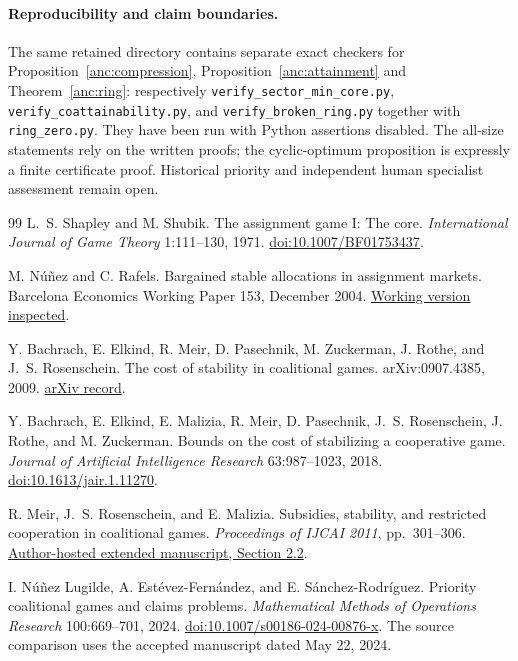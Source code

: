 \documentclass[11pt]{article}
\theoremstyle{remark}
\begin{document}
\paragraph{Reproducibility and claim boundaries.}
The same retained directory contains separate exact checkers for
Proposition~\ref{anc:compression}, Proposition~\ref{anc:attainment}
and Theorem~\ref{anc:ring}: respectively
\texttt{verify\_sector\_min\_core.py},
\texttt{verify\_coattainability.py}, and
\texttt{verify\_broken\_ring.py} together with \texttt{ring\_zero.py}.
They have been run with Python assertions disabled. The all-size
statements rely on the written proofs; the cyclic-optimum proposition
is expressly a finite certificate proof. Historical priority and
independent human specialist assessment remain open.

\begin{thebibliography}{99}
\small
{}
L.~S. Shapley and M. Shubik.
The assignment game I: The core.
\emph{International Journal of Game Theory} 1:111--130, 1971.
\href{https://doi.org/10.1007/BF01753437}{doi:10.1007/BF01753437}.

M. N\'u\~nez and C. Rafels.
Bargained stable allocations in assignment markets.
Barcelona Economics Working Paper 153, December 2004.
\href{https://www.bse.eu/sites/default/files/working_paper_pdfs/153.pdf}{Working version inspected}.

Y. Bachrach, E. Elkind, R. Meir, D. Pasechnik, M. Zuckerman,
J. Rothe, and J.~S. Rosenschein.
The cost of stability in coalitional games.
arXiv:0907.4385, 2009.
\href{https://arxiv.org/abs/0907.4385}{arXiv record}.

Y. Bachrach, E. Elkind, E. Malizia, R. Meir, D. Pasechnik,
J.~S. Rosenschein, J. Rothe, and M. Zuckerman.
Bounds on the cost of stabilizing a cooperative game.
\emph{Journal of Artificial Intelligence Research} 63:987--1023, 2018.
\href{https://doi.org/10.1613/jair.1.11270}{doi:10.1613/jair.1.11270}.

R. Meir, J.~S. Rosenschein, and E. Malizia.
Subsidies, stability, and restricted cooperation in coalitional games.
\emph{Proceedings of IJCAI 2011}, pp.~301--306.
\href{https://www.cs.huji.ac.il/~jeff/papers/coopmas11meir.pdf}{Author-hosted extended manuscript, Section 2.2}.

I. N\'u\~nez Lugilde, A. Est\'evez-Fern\'andez, and E. S\'anchez-Rodr\'iguez.
Priority coalitional games and claims problems.
\emph{Mathematical Methods of Operations Research} 100:669--701, 2024.
\href{https://doi.org/10.1007/s00186-024-00876-x}{doi:10.1007/s00186-024-00876-x}.
The source comparison uses the accepted manuscript dated May 22, 2024.


\end{thebibliography}
\end{document}
